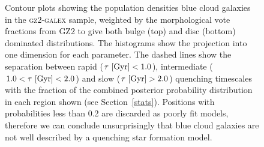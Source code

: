 \begin{figure}
\caption[Population densities of blue smooth and disc galaxies]{Contour plots showing the population densities blue cloud galaxies in the \textsc{gz2-galex} sample, weighted by the morphological vote fractions from GZ2 to give both bulge (top) and disc (bottom) dominated distributions. The histograms show the projection into one dimension for each parameter. The dashed lines show the separation between rapid ($\tau ~\rm{[Gyr]} < 1.0$), intermediate ($1.0 < \tau ~\rm{[Gyr]} < 2.0$) and slow ($\tau ~\rm{[Gyr]} > 2.0$) quenching timescales with the fraction of the combined posterior probability distribution in each region shown (see Section~\ref{stats}). Positions with probabilities less than 0.2 are discarded as poorly fit models, therefore we can conclude unsurprisingly that blue cloud galaxies are not well described by a quenching star formation model. }
\label{blue_c}
\end{figure}

